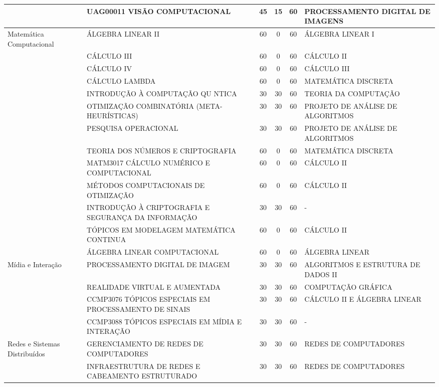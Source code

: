 \documentclass[
	12pt,				%
	openright,			%
  oneside,     %
	a4paper,			%
	chapter=TITLE,		%
	english,			%
	french,				%
	spanish,			%
	brazil				%
	]{abntex2}
\begin{document}
\begin{center}
\begin{tiny}
\begin{longtable}{p{2.5cm}p{5.5cm}cccp{3.3cm}}
      & UAG00011 VISÃO COMPUTACIONAL & 45 & 15 & 60 & PROCESSAMENTO DIGITAL DE IMAGENS \\ \midrule
    Matemática Computacional & ÁLGEBRA LINEAR II & 60 & 0 & 60 & ÁLGEBRA LINEAR I \\ \cline{2-6}
      & CÁLCULO III & 60 & 0 & 60 & CÁLCULO II \\ \cline{2-6}
      & CÁLCULO IV & 60 & 0 & 60 & CÁLCULO III \\ \cline{2-6}
      & CÁLCULO LAMBDA & 60 & 0 & 60 & MATEMÁTICA DISCRETA \\ \cline{2-6}
      & INTRODUÇÃO À COMPUTAÇÃO QU NTICA & 30 & 30 & 60 & TEORIA DA COMPUTAÇÃO \\ \cline{2-6}
      & OTIMIZAÇÃO COMBINATÓRIA (META-HEURÍSTICAS) & 30 & 30 & 60 & PROJETO DE ANÁLISE DE ALGORITMOS \\ \cline{2-6}
      & PESQUISA OPERACIONAL & 30 & 30 & 60 & PROJETO DE ANÁLISE DE ALGORITMOS \\ \cline{2-6}
      & TEORIA DOS NÚMEROS E CRIPTOGRAFIA & 60 & 0 & 60 & MATEMÁTICA DISCRETA \\ \cline{2-6}
      & MATM3017 CÁLCULO NUMÉRICO E COMPUTACIONAL & 60 & 0 & 60 & CÁLCULO II \\ \cline{2-6}
      & MÉTODOS COMPUTACIONAIS DE OTIMIZAÇÃO & 60 & 0 & 60 & CÁLCULO II \\ \cline{2-6}
      & INTRODUÇÃO À CRIPTOGRAFIA E SEGURANÇA DA INFORMAÇÃO & 30 & 30 & 60 & - \\ \cline{2-6}
      & TÓPICOS EM MODELAGEM MATEMÁTICA CONTINUA & 60 & 0 & 60 & CÁLCULO II \\ \cline{2-6}
      & ÁLGEBRA LINEAR COMPUTACIONAL & 60 & 0 & 60 & ÁLGEBRA LINEAR \\ \midrule
    Mídia e Interação 
    & PROCESSAMENTO DIGITAL DE IMAGEM & 30 & 30 & 60 & ALGORITMOS E ESTRUTURA DE DADOS II \\ \cline{2-6}
    & REALIDADE VIRTUAL E AUMENTADA & 30 & 30 & 60 & COMPUTAÇÃO GRÁFICA \\ \cline{2-6}
      & CCMP3076 TÓPICOS ESPECIAIS EM PROCESSAMENTO DE SINAIS & 30 & 30 & 60 & CÁLCULO II E ÁLGEBRA LINEAR \\ \cline{2-6}
      & CCMP3088 TÓPICOS ESPECIAIS EM MÍDIA E INTERAÇÃO & 30 & 30 & 60 & - \\ \midrule
    Redes e Sistemas Distribuídos & GERENCIAMENTO DE REDES DE COMPUTADORES & 30 & 30 & 60 & REDES DE COMPUTADORES \\ \cline{2-6}
      & INFRAESTRUTURA DE REDES E CABEAMENTO ESTRUTURADO & 30 & 30 & 60 & REDES DE COMPUTADORES \\ \cline{2-6}

\end{longtable}
\end{tiny}
\end{center}
\end{document}
